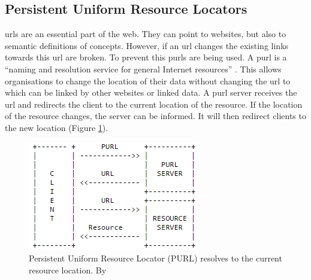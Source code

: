 \subsection{Persistent Uniform Resource Locators}
\acp{url} are an essential part of the web. They can point to websites, but also to semantic definitions of concepts. However, if an \ac{url} changes the existing links towards this \ac{url} are broken. To prevent this \aclp{purl} are being used. A \acf{purl} is a \enquote{naming and resolution service for general Internet resources} \citep{LD:PURL}. This allows organisations to change the location of their data without changing the \ac{url} to which can be linked by other websites or linked data. A \ac{purl} server receives the \ac{url} and redirects the client to the current location of the resource. If the location of the resource 
changes, the server can be informed. It will then redirect clients to the new location (Figure \ref{fig:PURL}).  

\begin{figure}
	\centering
	\includegraphics[width=0.6\linewidth]{figs/purl.png}
	\caption{Persistent Uniform Resource Locator (PURL) resolves to the current resource location. By \cite{LD:PURL}}
	\label{fig:PURL}
\end{figure} 






